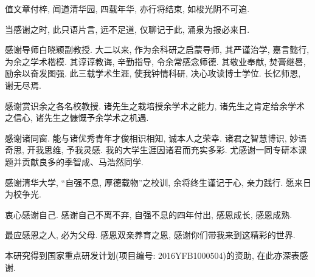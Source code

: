 \begin{acknowledgement}
值文章付梓, 闻道清华园, 四载年华, 亦行将结束, 如梭光阴不可追.

当感谢之时, 此只语片言, 远不足道, 仅聊记于此, 涌泉为报必来日.

感谢导师白晓颖副教授. 大二以来, 作为余科研之启蒙导师, 其严谨治学, 嘉言懿行, 为余之学术楷模. 其谆谆教诲, 辛勤指导, 令余常感念师德. 其敬业奉献, 焚膏继晷, 励余以奋发图强. 此三载学术生涯, 使我钟情科研, 决心攻读博士学位. 长忆师恩, 谢无尽焉.

感谢赏识余之各名校教授. 诸先生之栽培授余学术之能力, 诸先生之肯定给余学术之信心, 诸先生之慷慨予余学术之机遇.

感谢诸同窗. 能与诸优秀青年才俊相识相知, 诚本人之荣幸. 诸君之智慧博识, 妙语奇思, 开我思维, 予我灵感. 我的大学生涯因诸君而充实多彩. 尤感谢一同专研本课题并贡献良多的季智成、马浩然同学.

感谢清华大学, “自强不息, 厚德载物”之校训, 余将终生谨记于心, 亲力践行. 愿来日为校争光.

衷心感谢自己. 感谢自己不离不弃, 自强不息的四年付出, 感恩成长, 感恩成熟.

最应感恩之人, 必为父母. 感恩双亲养育之恩, 感谢你们带我来到这精彩的世界.

本研究得到国家重点研发计划(项目编号: 2016YFB1000504)的资助, 在此亦深表感谢.

\end{acknowledgement}

